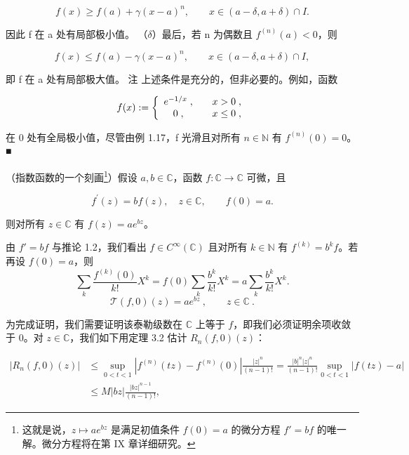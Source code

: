 \begin{application}
\begin{items}
\begin{subitems}
\[
f(x)\geq f(a)+\gamma(x-a)^{n},\qquad x\in(a-\delta,a+\delta)\cap I.
\]

因此 f 在 a 处有局部极小值。
（$ \delta $）最后，若 n 为偶数且 $ f^{(n)}(a) < 0 $，则

\[
f(x)\leq f(a)-\gamma(x-a)^{n},\qquad x\in(a-\delta,a+\delta)\cap I,
\]

即 f 在 a 处有局部极大值。
注 上述条件是充分的，但非必要的。例如，函数

\begin{equation*}
f(x):=\left\{\begin{array}{c l}{e^{-1/x}\;,}&{\quad x>0\;,}\\ {0\;,}&{\quad x\leq0\;,}\\ \end{array}\right.
\end{equation*}

在 0 处有全局极小值，尽管由例 1.17，f 光滑且对所有 $ n \in \mathbb{N} $ 有 $ f^{(n)}(0) = 0 $。■

\end{subitems}

\item

（指数函数的一个刻画\footnote{这就是说，$ z \mapsto ae^{bz} $ 是满足初值条件 $ f(0) = a $ 的微分方程 $ f' = bf $ 的唯一解。微分方程将在第 IX 章详细研究。}）假设 $ a, b \in \mathbb{C} $，函数 $ f: \mathbb{C} \to \mathbb{C} $ 可微，且

\begin{equation}
f^{\prime}(z)=b f(z),\quad z\in\mathbb{C},\qquad f(0)=a.
\end{equation}

则对所有 $ z \in \mathbb{C} $ 有 $ f(z) = ae^{bz} $。

\proofhead
由 $f'=bf$ 与推论 1.2，我们看出 $f\in C^\infty(\mathbb{C})$ 且对所有 $k\in\mathbb{N}$ 有 $f^{(k)}=b^kf$。若再设 $f(0)=a$，则
\[
\sum_{k}\frac{f^{(k)}(0)}{k!}X^{k}=f(0)\sum_{k}\frac{b^{k}}{k!}X^{k}=a\sum_{k}\frac{b^{k}}{k!}X^{k}.
\]
\[
\mathcal{T}(f,0)(z)=a e^{b z}~,\qquad z\in\mathbb{C}~.
\]

为完成证明，我们需要证明该泰勒级数在 $\mathbb{C}$ 上等于 $f$，即我们必须证明余项收敛于 $0$。对 $z \in \mathbb{C}$，我们如下用定理 3.2 估计 $R_n(f, 0)(z)$：

\begin{equation*}
\begin{aligned}
\left|R_{n}(f,0)(z)\right|&\leq\sup_{0<t<1}\left|f^{(n)}(tz)-f^{(n)}(0)\right|\frac{\left|z\right|^{n}}{(n-1)!}=\frac{\left|b\right|^{n}\left|z\right|^{n}}{(n-1)!}\sup_{0<t<1}\left|f(tz)-a\right|\\&\leq M\left|bz\right|\frac{\left|bz\right|^{n-1}}{(n-1)!},
\end{aligned}
\end{equation*}


\end{items}
\end{application}
